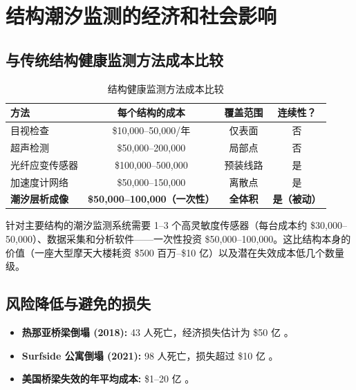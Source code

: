 \documentclass[12pt,a4paper]{article}
\theoremstyle{remark}
\begin{document}
	\section{结构潮汐监测的经济和社会影响}
	\label{sec:structural-economics}
	
	\subsection{与传统结构健康监测方法成本比较}
	
	\begin{table}[htbp]
		\centering
		\caption{结构健康监测方法成本比较}
		\label{tab:structural-costs}
		\small
		\begin{tabular}{lccc}
			\toprule
			\textbf{方法} & \textbf{每个结构的成本} & \textbf{覆盖范围} & \textbf{连续性？} \\
			\midrule
			目视检查 & \$10,000–50,000/年 & 仅表面 & 否 \\
			超声检测 & \$50,000–200,000 & 局部点 & 否 \\
			光纤应变传感器 & \$100,000–500,000 & 预装线路 & 是 \\
			加速度计网络 & \$50,000–150,000 & 离散点 & 是 \\
			\textbf{潮汐层析成像} & \textbf{\$50,000–100,000（一次性）} & \textbf{全体积} & \textbf{是（被动）} \\
			\bottomrule
		\end{tabular}
	\end{table}
	
	针对主要结构的潮汐监测系统需要 1–3 个高灵敏度传感器（每台成本约 \$30,000–50,000）、数据采集和分析软件——一次性投资 \$50,000–100,000。这比结构本身的价值（一座大型摩天大楼耗资 \$500 百万–\$10 亿）以及潜在失效成本低几个数量级。
	
	\subsection{风险降低与避免的损失}
	
	\begin{itemize}
		\item \textbf{热那亚桥梁倒塌 (2018):} 43 人死亡，经济损失估计为 \$50 亿 \cite{Genoa2018}。
		\item \textbf{Surfside 公寓倒塌 (2021):} 98 人死亡，损失超过 \$10 亿 \cite{Surfside2021}。
		\item \textbf{美国桥梁失效的年平均成本:} \$1–20 亿 \cite{ASCE2021}。
	\end{itemize}
	
\end{document}
